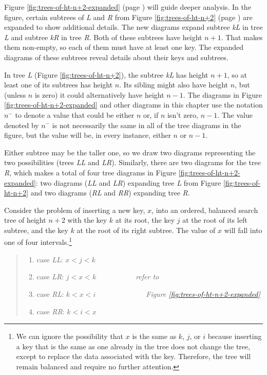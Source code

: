 Figure \ref{fig:trees-of-ht-n+2-expanded} (page \pageref{fig:trees-of-ht-n+2-expanded})
will guide deeper analysis.
In the figure, certain subtrees of \emph{L} and \emph{R} from
Figure \ref{fig:trees-of-ht-n+2} (page \pageref{fig:trees-of-ht-n+2})
are expanded to show additional details.
The new diagrams expand subtree
\emph{kL} in tree \emph{L} and subtree \emph{kR} in tree \emph{R}.
Both of these subtrees have height $n+1$.
That makes them non-empty, so each of them must have at least one key.
The expanded diagrams of these subtrees
reveal details about their keys and subtrees.

In tree \emph{L} (Figure \ref{fig:trees-of-ht-n+2}),
the subtree \emph{kL} has height $n+1$,
so at least one of its subtrees has height $n$.
Its sibling might also have height $n$, but (unless $n$ is zero)
it could alternatively have height $n-1$.
The diagrams in Figure \ref{fig:trees-of-ht-n+2-expanded}
and other diagrams in this chapter
use the notation $n^-$
to denote a value that could be either $n$
or, if $n$ isn't zero, $n-1$.
The value denoted by $n^-$ is not necessarily the same
in all of the tree diagrams in the figure,
but the value will be, in every instance,
either $n$ or $n-1$.

Either subtree may be the taller one,
so we draw two diagrams representing the two possibilities
(trees \emph{LL} and \emph{LR}).
Similarly, there are two diagrams for the tree \emph{R},
which makes a total of four tree diagrams in
Figure \ref{fig:trees-of-ht-n+2-expanded}:
two diagrams (\emph{LL} and \emph{LR})
expanding tree \emph{L} from Figure \ref{fig:trees-of-ht-n+2}
and two diagrams (\emph{RL} and \emph{RR}) expanding tree \emph{R}.

Consider the problem of inserting a new key, $x$, into
an ordered, balanced search tree of height $n+2$ with the key $k$
at its root, the key $j$ at the root of its left subtree,
and the key $k$ at the root of its right subtree.
The value of $x$ will fall into one of four intervals.\footnote{We
can ignore the possibility that $x$ is the same as
$k$, $j$, or $i$ because
inserting a key that is the same as one already in the
tree does not change the tree,
except to replace the data associated with the key.
Therefore, the tree will remain balanced and
require no further attention.}
\label{cases:ht-n+2}\begin{quote}
\begin{enumerate}
\item case \emph{LL}: $x < j < k$
\item case \emph{LR}: $j < x < k$~~~~~~~~~~~\emph{refer to }
\item case \emph{RL}: $k < x < i$~~~~~~~~~~~~~~\emph{Figure \ref{fig:trees-of-ht-n+2-expanded}}
\item case \emph{RR}: $k < i < x$
\end{enumerate}
\end{quote}

